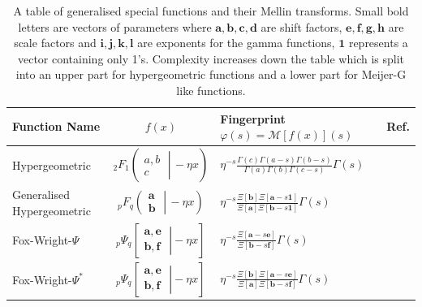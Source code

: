 \documentclass{article}
\begin{document}
\begin{table}
\caption{A table of generalised special functions and their Mellin transforms. Small bold letters are vectors of parameters where $\mathbf{a,b,c,d}$ are shift factors, $\mathbf{e,f,g,h}$ are scale factors and $\mathbf{i,j,k,l}$ are exponents for the gamma functions, $\mathbf{1}$ represents a vector containing only 1's. Complexity increases down the table which is split into an upper part for hypergeometric functions and a lower part for Meijer-G like functions.}
\centering
\begin{tabular}{|p{2.3cm}|c|p{3.5cm}|c|}
\hline
Function \newline Name & $f(x)$ & Fingerprint \newline $\varphi(s)=\mathcal{M}[f(x)](s)$ & Ref. \\
\hline
Hypergeometric & $_2 F_1 \!\left( \left. \begin{matrix} a,b \\ c \end{matrix} \; \right| \, -\eta x \right)$ & $\eta^{-s}\frac{\Gamma(c)\Gamma(a-s)\Gamma(b-s)}{\Gamma(a)\Gamma(b)\Gamma(c-s)}\Gamma(s)$ & \cite{Kolbig1995,Bateman1953}\\
Generalised \newline Hypergeometric &  $_p F_q \!\left( \left. \begin{matrix} \mathbf{a} \\ \mathbf{b} \end{matrix} \; \right| \, -\eta x \right)$ & $\eta^{-s}\frac{\Xi[\mathbf{b}]\Xi[\mathbf{a}-s\mathbf{1}]}{\Xi[\mathbf{a}]\Xi[\mathbf{b}-s\mathbf{1}]}\Gamma(s)$ &  \cite{Kolbig1995,Bateman1953}\\
Fox-Wright-$\Psi$ & $_p\Psi_q \!\left[\left.\begin{matrix}
\mathbf{a},\mathbf{e} \\
\mathbf{b},\mathbf{f} \end{matrix} \;\right| -\eta x  \right]$ & $\eta^{-s}\frac{\Xi[\mathbf{a}-s\mathbf{e}]}{\Xi[\mathbf{b}-s\mathbf{f}]}\Gamma(s)$ & \cite{Wright1935}\\
Fox-Wright-$\Psi^*$ & $_p\Psi_q \!\left[\left.\begin{matrix}
\mathbf{a},\mathbf{e} \\
\mathbf{b},\mathbf{f} \end{matrix} \;\right| -\eta x  \right]$ & $\eta^{-s}\frac{\Xi[\mathbf{b}]\Xi[\mathbf{a}-s\mathbf{e}]}{\Xi[\mathbf{a}]\Xi[\mathbf{b}-s\mathbf{f}]}\Gamma(s)$ & \cite{Wright1935}\\

\end{tabular}
\end{table}
\end{document}
